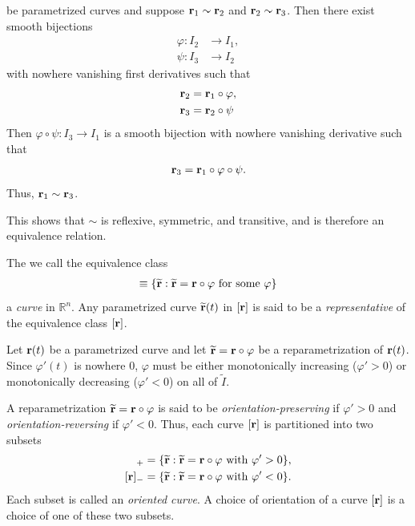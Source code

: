 \documentclass[12pt,letterpaper,reqno]{article}
\numberwithin{equation}{section}
\newcommand{\R}{\ensuremath{\mathbb R}}
\newcommand{\bbr}{{\bf r}}
\begin{document}
{\begin{pf}
\begin{enumerate}[(1)]
		be parametrized curves and suppose $\bbr_1 \sim \bbr_2$ and $\bbr_2 \sim \bbr_3$. Then there exist smooth bijections 
		\begin{align*}
			\varphi:I_2 &\to I_1, \\
			\psi:I_3 &\to I_2
		\end{align*} 
		with nowhere vanishing first derivatives such that
		\begin{align*}
			\bbr_2&=\bbr_1 \circ \varphi, \\
			\bbr_3&=\bbr_2 \circ \psi
		\end{align*}
		Then $\varphi \circ \psi:I_3 \to I_1$ is a smooth bijection with nowhere vanishing derivative such that
		\begin{align*}
			\bbr_3=\bbr_1 \circ \varphi \circ \psi.
		\end{align*}
		Thus, $\bbr_1 \sim \bbr_3$.
	\end{enumerate}
	This shows that $\sim$ is reflexive, symmetric, and transitive, and is therefore an equivalence relation.
\end{pf}
\begin{defn}[Curve]
	The we call the equivalence class
	\begin{align*}
		[\bbr]\equiv \{\widetilde{\bbr}:\widetilde{\bbr}=\bbr \circ \varphi \text{ for some } \varphi\}
	\end{align*} 
 a \emph{curve} in $\R^n$. Any parametrized curve $\widetilde{\bbr}(t)$ in $[\bbr]$ is said to be a \emph{representative} of the equivalence class $[\bbr]$. 
\end{defn}

Let $\bbr(t)$ be a parametrized curve and let $\widetilde{\bbr}=\bbr \circ \varphi$ be a reparametrization of $\bbr(t)$. Since $\varphi'(t)$ is nowhere 0, $\varphi$ must be either monotonically increasing ($\varphi'>0$) or monotonically decreasing ($\varphi'<0$) on all of $\tilde{I}$.

\begin{defn}
A reparametrization $\widetilde{\bbr}=\bbr \circ \varphi$ is said to be \emph{orientation-preserving} if $\varphi'>0$ and \emph{orientation-reversing} if $\varphi'<0$. Thus, each curve $[\bbr]$ is partitioned into two subsets
\begin{align*}
	[\bbr]_+&=\{\widetilde{\bbr}:\widetilde{\bbr}=\bbr \circ \varphi \text{ with } \varphi'>0\}, \\
	[\bbr]_-&=\{\widetilde{\bbr}:\widetilde{\bbr}=\bbr \circ \varphi \text{ with } \varphi'<0\}. \\
\end{align*}
Each subset is called an \emph{oriented curve}. A choice of orientation of a curve $[\bbr]$ is a choice of one of these two subsets.
\end{defn}

}
\end{document}
